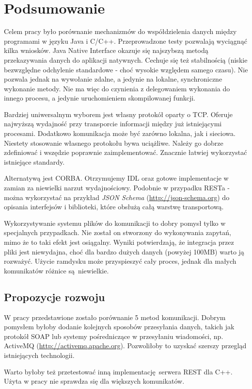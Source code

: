 \chapter{Podsumowanie}

Celem pracy było porównanie mechanizmów do współdzielenia danych między programami w języku Java i C/C++. Przeprowadzone testy pozwalają wyciągnąć kilka wniosków.
Java Native Interface okazuje się najszybszą metodą przekazywania danych do aplikacji natywnych. Cechuje się też stabilnością (niskie bezwzględne odchylenie standardowe - choć wysokie względem samego czasu). Nie pozwala jednak na wywołanie zdalne, a jedynie na lokalne, synchroniczne wykonanie metody. Nie ma więc do czynienia z delegowaniem wykonania do innego procesu, a jedynie uruchomieniem skompilowanej funkcji.

Bardziej uniwersalnym wyborem jest własny protokół oparty o TCP. Oferuje najwyższą wydajność przy transporcie informacji między już istniejącymi procesami. Dodatkowo komunikacja może być zarówno lokalna, jak i sieciowa. Niestety stosowanie własnego protokołu bywa uciążliwe. Należy go dobrze zdefiniować i wszędzie poprawnie zaimplementować. Znacznie łatwiej wykorzystać istniejące standardy.

Alternatywą jest CORBA. Otrzymujemy IDL oraz gotowe implementacje w zamian za niewielki narzut wydajnościowy. Podobnie w przypadku RESTa - można wykorzystać na przykład \textit{JSON Schema} (\url{http://json-schema.org}) do opisania interfejsów i biblioteki, które obsłużą całą warstwę transportową.

Wykorzystywanie systemu plików do komunikacji to dobry pomysł tylko w specjalnych przypadkach. Nie został on stworzony do wykonywania zapytań, mimo że to taki efekt jest osiągalny. Wyniki potwierdzają, że integracja przez pliki jest niewydajna, choć dla bardzo dużych danych (powyżej 100MB) warto ją rozważyć. Użycie ramdysku może przyspieszyć cały proces, jednak dla małych komunikatów różnice są niewielkie.


\section{Propozycje rozwoju}

W pracy przedstawione zostało porównanie 5 metod komunikacji. Dobrym pomysłem byłoby dodanie kolejnych sposobów przesyłania danych, takich jak protokół SOAP lub systemy pośredniczące w przesyłaniu wiadomości, np. ActiveMQ (\url{http://activemq.apache.org}). Pozwoliłoby to uzyskać szerszy przegląd istniejących technologii.

Warto byłoby też przetestować inną implementację serwera REST dla C++. Użyta w pracy nie sprawdza się dla większych komunikatów.
